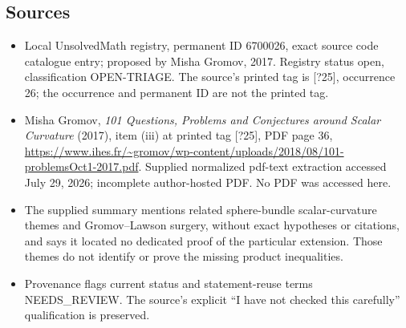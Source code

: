 \documentclass[11pt]{article}
\begin{document}
\subsection{Sources}
\begin{itemize}
\item Local UnsolvedMath registry, permanent ID 6700026, exact source code catalogue entry; proposed by Misha Gromov, 2017. Registry status open, classification OPEN-TRIAGE. The source's printed tag is [?25], occurrence 26; the occurrence and permanent ID are not the printed tag.
\item Misha Gromov, \emph{101 Questions, Problems and Conjectures around Scalar Curvature} (2017), item (iii) at printed tag [?25], PDF page 36, \url{https://www.ihes.fr/~gromov/wp-content/uploads/2018/08/101-problemsOct1-2017.pdf}. Supplied normalized pdf-text extraction accessed July 29, 2026; incomplete author-hosted PDF. No PDF was accessed here.
\item The supplied summary mentions related sphere-bundle scalar-curvature themes and Gromov--Lawson surgery, without exact hypotheses or citations, and says it located no dedicated proof of the particular extension. Those themes do not identify or prove the missing product inequalities.
\item Provenance flags current status and statement-reuse terms NEEDS\_REVIEW. The source's explicit ``I have not checked this carefully'' qualification is preserved.
\end{itemize}
\end{document}
